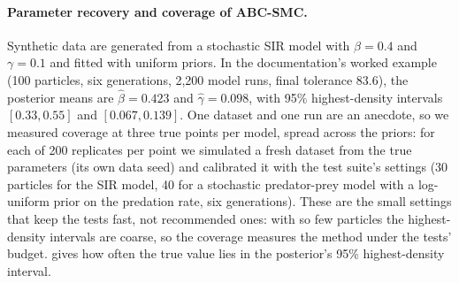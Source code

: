 \begin{table}[htbp]
  \centering
  \small
  \caption{Sobol indices of the Ishigami function over 32 independent scramblings of the
  design at two sample sizes: the mean and standard deviation of the 32 estimates and their
  2.5--97.5\% range (the randomised-QMC uncertainty), the mean half-width of the row
  bootstrap's 95\% interval, its ratio to $1.96$ standard deviations across scramblings, and
  how many of the 32 bootstrap intervals contain the analytical value. Generated by
  .}
  \label{tab:sobol-scramblings}
  \setlength{\tabcolsep}{3.5pt}
  \footnotesize
  
\end{table}

\paragraph{Parameter recovery and coverage of ABC-SMC.} Synthetic data are generated from a
stochastic SIR model with $\beta = 0.4$ and $\gamma = 0.1$ and fitted with uniform priors. In
the documentation's worked example (100 particles, six generations, 2,200 model runs, final
tolerance 83.6), the posterior means are $\hat\beta = 0.423$ and $\hat\gamma = 0.098$, with 95\%
highest-density intervals $[0.33, 0.55]$ and $[0.067, 0.139]$. One dataset and one run are an
anecdote, so we measured coverage at three true points per model, spread across the priors:
for each of 200 replicates per point we simulated a fresh dataset from the true parameters (its
own data seed) and calibrated it with the test suite's settings
(30 particles for the SIR model, 40 for a stochastic predator-prey model with a log-uniform
prior on the predation rate, six generations). These are the small settings that keep the
tests fast, not recommended ones: with so few particles the highest-density intervals are
coarse, so the coverage measures the method under the tests' budget.  gives how often the true
value lies in the posterior's 95\% highest-density interval.

\begin{table}[htbp]
  \centering
  \small
  \caption{ABC-SMC at the test suite's budget (30 and 40 particles, below the 100 a study should
  use; see the text for coverage at 100) over 200 synthetic datasets at each of three true points
  per model: mean relative error of the posterior
  mean (signed and absolute), mean absolute error of the posterior median, and how often the
  true value lies in the 95\% highest-density interval (HDI), with its Clopper--Pearson 95\%
  interval \citep{clopper1934use}. Generated by .}
  \label{tab:recovery}
  
\end{table}

